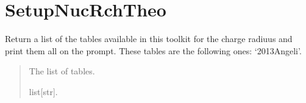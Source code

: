 \documentclass[letterpaper,10pt,english]{sphinxmanual}
\begin{document}
\sphinxstepscope


\section{SetupNucRchTheo}
\label{\detokenize{source/api/setup_nuc_rch_theo:setupnucrchtheo}}\label{\detokenize{source/api/setup_nuc_rch_theo::doc}}\label{\detokenize{source/api/setup_nuc_rch_theo:module-nucleardatapy.nuc.setup_rch_theo}}

\begin{fulllineitems}
\label{\detokenize{source/api/setup_nuc_rch_theo:nucleardatapy.nuc.setup_rch_theo.rch_theo_tables}}
\pysigstartsignatures
{}
\pysigstopsignatures
\sphinxAtStartPar
Return a list of the tables available in this toolkit for the charge radiuus and
print them all on the prompt.  These tables are the following
ones: ‘2013\sphinxhyphen{}Angeli’.
\begin{quote}\begin{description}
\sphinxAtStartPar
The list of tables.

\sphinxAtStartPar
list{[}str{]}.

\end{description}\end{quote}

\end{fulllineitems}

\end{document}
